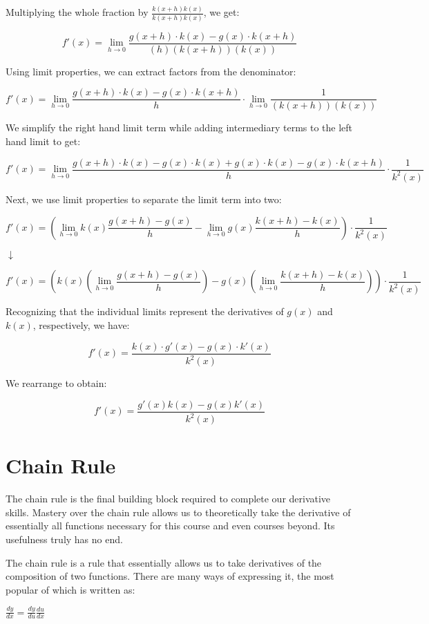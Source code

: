 \documentclass[11pt]{article}
\begin{document}
Multiplying the whole fraction by $\frac{k(x+h)k(x)}{k(x+h)k(x)}$, we get:

\[f'(x) = \lim_{{h \to 0}} \frac{g(x+h) \cdot k(x) - g(x) \cdot k(x+h)}{(h)(k(x+h))(k(x))}\]

Using limit properties, we can extract factors from the denominator:

\[f'(x) = \lim_{{h \to 0}} \frac{g(x+h) \cdot k(x) - g(x) \cdot k(x+h)}{h} \cdot \lim_{{h \to 0}} \frac{1}{(k(x+h))(k(x))}   \]

We simplify the right hand limit term while adding intermediary terms to the left hand limit to get:

\[f'(x) = \lim_{{h \to 0}} \frac{g(x+h) \cdot k(x) - g(x) \cdot k(x) + g(x) \cdot k(x) - g(x) \cdot k(x+h)}{h} \cdot \frac{1}{k^2(x)}   \]

Next, we use limit properties to separate the limit term into two:

\[f'(x) = (\lim_{{h \to 0}} k(x) \frac{g(x+h)-g(x)}{h} - \lim_{{h \to 0}} g(x) \frac{k(x+h)-k(x)}{h}) \cdot \frac{1}{k^2(x)} \]
\begin{center}
$\downarrow$
\end{center}
\[f'(x) =( k(x)(\lim_{{h \to 0}} \frac{g(x+h)-g(x)}{h}) - g(x)(\lim_{{h \to 0}} \frac{k(x+h)-k(x)}{h})) \cdot \frac{1}{k^2(x)} \]

Recognizing that the individual limits represent the derivatives of \(g(x)\) and \(k(x)\), respectively, we have:

\[ f'(x) = \frac{k(x)\cdot g'(x) - g(x) \cdot k'(x)}{k^2(x)} \]

We rearrange to obtain:

\[ f'(x) = \frac{g'(x)k(x)-g(x)k'(x)}{k^2(x)} \]




\section{Chain Rule}
The chain rule is the final building block required to complete our derivative skills. Mastery over the chain rule allows us to theoretically take the derivative of essentially all functions necessary for this course and even courses beyond. Its usefulness truly has no end. 

The chain rule is a rule that essentially allows us to take derivatives of the composition of two functions. There are many ways of expressing it, the most popular of which is written as: 

\begin{center}
$\frac{dy}{dx} = \frac{dy}{du} \frac{du}{dx}$
\end{center}
\end{document}
